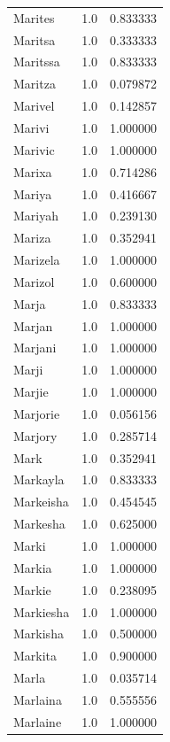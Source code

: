 \documentclass[
  letterpaper,
  DIV=11,
  numbers=noendperiod]{scrreprt}
\begin{document}
\begin{tabular}{lrr}
Marites         &   1.0 &   0.833333 \\
Maritsa         &   1.0 &   0.333333 \\
Maritssa        &   1.0 &   0.833333 \\
Maritza         &   1.0 &   0.079872 \\
Marivel         &   1.0 &   0.142857 \\
Marivi          &   1.0 &   1.000000 \\
Marivic         &   1.0 &   1.000000 \\
Marixa          &   1.0 &   0.714286 \\
Mariya          &   1.0 &   0.416667 \\
Mariyah         &   1.0 &   0.239130 \\
Mariza          &   1.0 &   0.352941 \\
Marizela        &   1.0 &   1.000000 \\
Marizol         &   1.0 &   0.600000 \\
Marja           &   1.0 &   0.833333 \\
Marjan          &   1.0 &   1.000000 \\
Marjani         &   1.0 &   1.000000 \\
Marji           &   1.0 &   1.000000 \\
Marjie          &   1.0 &   1.000000 \\
Marjorie        &   1.0 &   0.056156 \\
Marjory         &   1.0 &   0.285714 \\
Mark            &   1.0 &   0.352941 \\
Markayla        &   1.0 &   0.833333 \\
Markeisha       &   1.0 &   0.454545 \\
Markesha        &   1.0 &   0.625000 \\
Marki           &   1.0 &   1.000000 \\
Markia          &   1.0 &   1.000000 \\
Markie          &   1.0 &   0.238095 \\
Markiesha       &   1.0 &   1.000000 \\
Markisha        &   1.0 &   0.500000 \\
Markita         &   1.0 &   0.900000 \\
Marla           &   1.0 &   0.035714 \\
Marlaina        &   1.0 &   0.555556 \\
Marlaine        &   1.0 &   1.000000 \\

\end{tabular}
\end{document}
